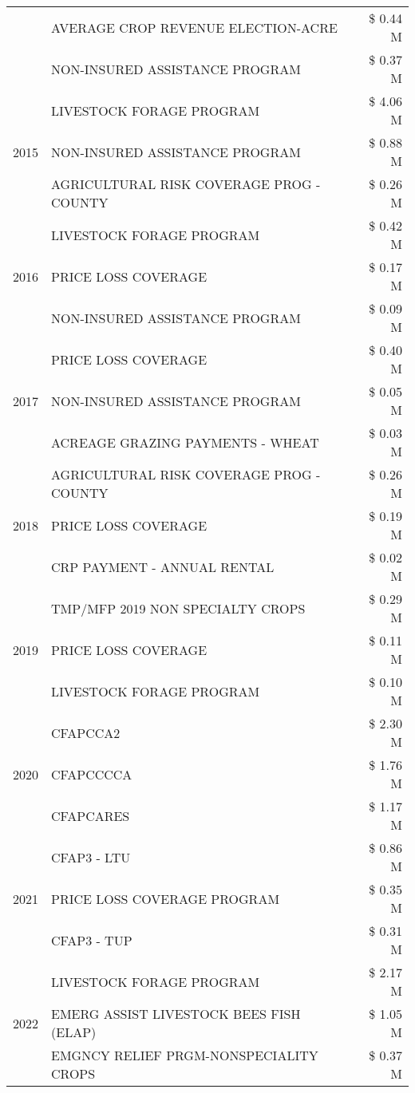 \begin{tabular}{llr}
 & AVERAGE CROP REVENUE ELECTION-ACRE & \$ 0.44 M \\
 & NON-INSURED ASSISTANCE PROGRAM & \$ 0.37 M \\
\cline{1-3}
\multirow[t]{3}{*}{2015} & LIVESTOCK FORAGE PROGRAM & \$ 4.06 M \\
 & NON-INSURED ASSISTANCE PROGRAM & \$ 0.88 M \\
 & AGRICULTURAL RISK COVERAGE PROG - COUNTY & \$ 0.26 M \\
\cline{1-3}
\multirow[t]{3}{*}{2016} & LIVESTOCK FORAGE PROGRAM & \$ 0.42 M \\
 & PRICE LOSS COVERAGE & \$ 0.17 M \\
 & NON-INSURED ASSISTANCE PROGRAM & \$ 0.09 M \\
\cline{1-3}
\multirow[t]{3}{*}{2017} & PRICE LOSS COVERAGE & \$ 0.40 M \\
 & NON-INSURED ASSISTANCE PROGRAM & \$ 0.05 M \\
 & ACREAGE GRAZING PAYMENTS - WHEAT & \$ 0.03 M \\
\cline{1-3}
\multirow[t]{3}{*}{2018} & AGRICULTURAL RISK COVERAGE PROG - COUNTY & \$ 0.26 M \\
 & PRICE LOSS COVERAGE & \$ 0.19 M \\
 & CRP PAYMENT - ANNUAL RENTAL & \$ 0.02 M \\
\cline{1-3}
\multirow[t]{3}{*}{2019} & TMP/MFP 2019 NON SPECIALTY CROPS & \$ 0.29 M \\
 & PRICE LOSS COVERAGE & \$ 0.11 M \\
 & LIVESTOCK FORAGE PROGRAM & \$ 0.10 M \\
\cline{1-3}
\multirow[t]{3}{*}{2020} & CFAPCCA2 & \$ 2.30 M \\
 & CFAPCCCCA & \$ 1.76 M \\
 & CFAPCARES & \$ 1.17 M \\
\cline{1-3}
\multirow[t]{3}{*}{2021} & CFAP3 - LTU & \$ 0.86 M \\
 & PRICE LOSS COVERAGE PROGRAM & \$ 0.35 M \\
 & CFAP3 - TUP & \$ 0.31 M \\
\cline{1-3}
\multirow[t]{3}{*}{2022} & LIVESTOCK FORAGE PROGRAM & \$ 2.17 M \\
 & EMERG ASSIST LIVESTOCK BEES FISH (ELAP) & \$ 1.05 M \\
 & EMGNCY RELIEF PRGM-NONSPECIALITY CROPS & \$ 0.37 M \\
\cline{1-3}
\bottomrule
\end{tabular}
